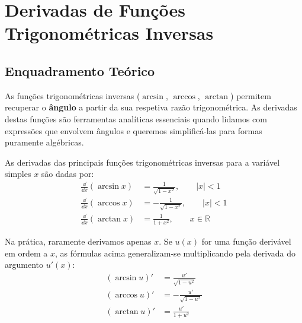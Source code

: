 
\section{Derivadas de Funções Trigonométricas Inversas}

\subsection{Enquadramento Teórico}

\begin{notebox}[title={Intuição Essencial}]
  As funções trigonométricas inversas ($\arcsin$, $\arccos$, $\arctan$) permitem recuperar o \textbf{ângulo} a partir da sua respetiva razão trigonométrica. As derivadas destas funções são ferramentas analíticas essenciais quando lidamos com expressões que envolvem ângulos e queremos simplificá-las para formas puramente algébricas.
\end{notebox}

\begin{defbox}[title={Derivadas Fundamentais}]
  As derivadas das principais funções trigonométricas inversas para a variável simples $x$ são dadas por:
  \begin{align*}
      \frac{\dd}{\dd x} (\arcsin x) &= \frac{1}{\sqrt{1-x^2}}, \qquad |x| < 1 \\[1ex]
      \frac{\dd}{\dd x} (\arccos x) &= -\frac{1}{\sqrt{1-x^2}}, \qquad |x| < 1 \\[1ex]
      \frac{\dd}{\dd x} (\arctan x) &= \frac{1}{1+x^2}, \qquad x \in \mathbb{R}
  \end{align*}
\end{defbox}

\begin{defbox}[title={Generalização com a Regra da Cadeia}]
  Na prática, raramente derivamos apenas $x$. Se $u(x)$ for uma função derivável em ordem a $x$, as fórmulas acima generalizam-se multiplicando pela derivada do argumento $u'(x)$:
  \begin{align*}
      (\arcsin u)' &= \frac{u'}{\sqrt{1-u^2}} \\[1ex]
      (\arccos u)' &= -\frac{u'}{\sqrt{1-u^2}} \\[1ex]
      (\arctan u)' &= \frac{u'}{1+u^2}
  \end{align*}
\end{defbox}

